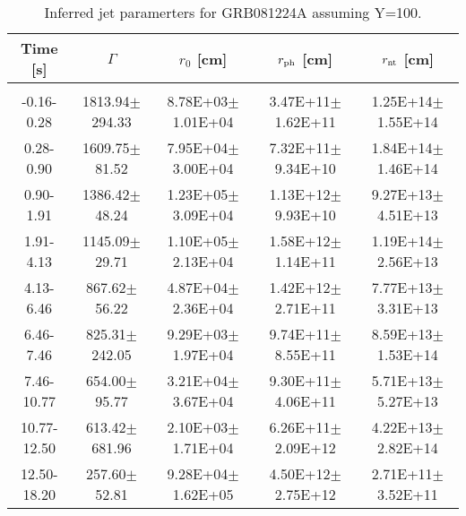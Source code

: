 \begin{table}[htp]
\scriptsize
\label{tab:}
\begin{tabular}{c c c c c}
Time [s] & $\Gamma$ & $r_0$ [cm] & $r_{\rm ph}$ [cm] & $r_{\rm nt}$ [cm] \\
\hline \hline\\ 

-0.16-0.28 & 1813.94$\pm$294.33 & 8.78E+03$\pm$1.01E+04 & 3.47E+11$\pm$1.62E+11 & 1.25E+14$\pm$1.55E+14 \\ 

0.28-0.90 & 1609.75$\pm$81.52 & 7.95E+04$\pm$3.00E+04 & 7.32E+11$\pm$9.34E+10 & 1.84E+14$\pm$1.46E+14 \\ 

0.90-1.91 & 1386.42$\pm$48.24 & 1.23E+05$\pm$3.09E+04 & 1.13E+12$\pm$9.93E+10 & 9.27E+13$\pm$4.51E+13 \\ 

1.91-4.13 & 1145.09$\pm$29.71 & 1.10E+05$\pm$2.13E+04 & 1.58E+12$\pm$1.14E+11 & 1.19E+14$\pm$2.56E+13 \\ 

4.13-6.46 & 867.62$\pm$56.22 & 4.87E+04$\pm$2.36E+04 & 1.42E+12$\pm$2.71E+11 & 7.77E+13$\pm$3.31E+13 \\ 

6.46-7.46 & 825.31$\pm$242.05 & 9.29E+03$\pm$1.97E+04 & 9.74E+11$\pm$8.55E+11 & 8.59E+13$\pm$1.53E+14 \\ 

7.46-10.77 & 654.00$\pm$95.77 & 3.21E+04$\pm$3.67E+04 & 9.30E+11$\pm$4.06E+11 & 5.71E+13$\pm$5.27E+13 \\ 

10.77-12.50 & 613.42$\pm$681.96 & 2.10E+03$\pm$1.71E+04 & 6.26E+11$\pm$2.09E+12 & 4.22E+13$\pm$2.82E+14 \\ 

12.50-18.20 & 257.60$\pm$52.81 & 9.28E+04$\pm$1.62E+05 & 4.50E+12$\pm$2.75E+12 & 2.71E+11$\pm$3.52E+11 \\ 

\end{tabular}
\caption{Inferred jet paramerters for GRB081224A assuming Y=100.}
\end{table}
